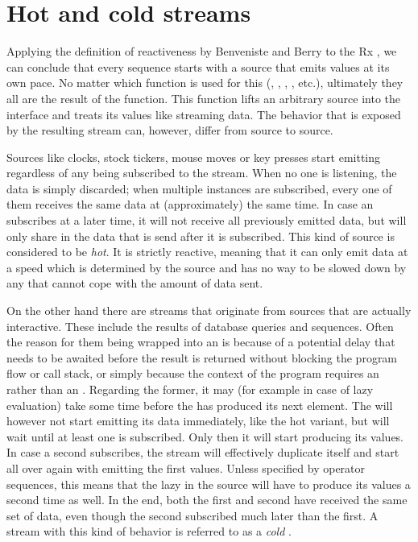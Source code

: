 \section{Hot and cold streams}
Applying the definition of reactiveness by Benveniste and Berry \cite{berry1991-Reactive} to the Rx \obs, we can conclude that every \obs sequence starts with a source that emits values at its own pace. No matter which function is used for this (, , , , etc.), ultimately they all are the result of the  function. This function lifts an arbitrary source into the \obs interface and treats its values like streaming data. The behavior that is exposed by the resulting stream can, however, differ from source to source.

Sources like clocks, stock tickers, mouse moves or key presses start emitting regardless of any \obv being subscribed to the stream. When no one is listening, the data is simply discarded; when multiple \obv instances are subscribed, every one of them receives the same data at (approximately) the same time. In case an \obv subscribes at a later time, it will not receive all previously emitted data, but will only share in the data that is send after it is subscribed. This kind of source is considered to be \textit{hot}. It is strictly reactive, meaning that it can only emit data at a speed which is determined by the source and has no way to be slowed down by any \obv that cannot cope with the amount of data sent.

On the other hand there are streams that originate from sources that are actually interactive. These include the results of database queries and \ieb sequences. Often the reason for them being wrapped into an \obs is because of a potential delay that needs to be awaited before the result is returned without blocking the program flow or call stack, or simply because the context of the program requires an \obs rather than an \ieb. Regarding the former, it may (for example in case of lazy evaluation) take some time before the \ier has produced its next element. The \obs will however not start emitting its data immediately, like the hot variant, but will wait until at least one \obv is subscribed. Only then it will start producing its values. In case a second \obv subscribes, the stream will effectively duplicate itself and start all over again with emitting the first values. Unless specified by operator sequences, this means that the lazy \ier in the source will have to produce its values a second time as well. In the end, both the first and second \obv have received the same set of data, even though the second subscribed much later than the first. A stream with this kind of behavior is referred to as a \textit{cold} \obs.

